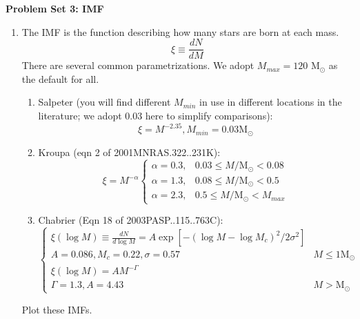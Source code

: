\documentclass[twoside]{tufte-book} %
\newcommand{\msun}{\ensuremath{\mathrm{M}_\odot}\xspace}
\begin{document}
\noindent\textbf{Problem Set 3: IMF}

\begin{enumerate}
    \item The IMF is the function describing how many stars are born at each mass.
        \begin{equation}
            \xi \equiv \frac{dN}{dM}
        \end{equation}
        There are several common parametrizations.  We adopt $M_{max} = 120$ \msun
        as the default for all.
        \begin{enumerate}
            \item Salpeter (you will find different $M_{min}$ in use in
                different locations in the literature; we adopt 0.03 here
                to simplify comparisons):
            \begin{equation}
                \xi = M^{-2.35}, M_{min}=0.03 \msun
            \end{equation}

            \item Kroupa (eqn 2 of 2001MNRAS.322..231K):\\
            $$ \xi = M^{-\alpha}
            \begin{cases}
                  \alpha=0.3, & 0.03 \leq M/\msun < 0.08 \\
                  \alpha=1.3, & 0.08 \leq M/\msun < 0.5 \\
                  \alpha=2.3, & 0.5 \leq M/\msun < M_{max}
            \end{cases}
            $$

            \item Chabrier (Eqn 18 of 2003PASP..115..763C):\\
                $$
            \begin{cases}
                \xi(\log M) \equiv \frac{dN}{d\log M} = A \exp\left[-(\log M - \log M_c)^2/2\sigma^2\right]  \\
                A = 0.086, M_c = 0.22, \sigma=0.57 &  M\leq1 \msun\\
                \xi(\log M) = A M^{-\Gamma}   \\
                \Gamma = 1.3, A = 4.43 & M>\msun
            \end{cases}
            $$
    

        \end{enumerate}
    Plot these IMFs.


\end{enumerate}
\end{document}

